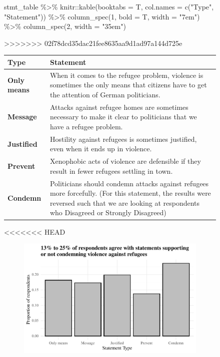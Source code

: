 \documentclass[
]{article}
\newenvironment{Shaded}{\begin{snugshade}}{\end{snugshade}}
\newcommand{\AttributeTok}[1]{\textcolor[rgb]{0.40,0.45,0.13}{#1}}
\newcommand{\DecValTok}[1]{\textcolor[rgb]{0.68,0.00,0.00}{#1}}
\newcommand{\FunctionTok}[1]{\textcolor[rgb]{0.28,0.35,0.67}{#1}}
\newcommand{\NormalTok}[1]{\textcolor[rgb]{0.00,0.23,0.31}{#1}}
\newcommand{\SpecialCharTok}[1]{\textcolor[rgb]{0.37,0.37,0.37}{#1}}
\newcommand{\StringTok}[1]{\textcolor[rgb]{0.13,0.47,0.30}{#1}}
\begin{document}
\begin{figure}
\begin{table}
\begin{Shaded}
\begin{Highlighting}[]
\NormalTok{stmt\_table }\SpecialCharTok{\%\textgreater{}\%} 
\NormalTok{  knitr}\SpecialCharTok{::}\FunctionTok{kable}\NormalTok{(}\AttributeTok{booktabs =}\NormalTok{ T, }\AttributeTok{col.names =} \FunctionTok{c}\NormalTok{(}\StringTok{"Type"}\NormalTok{, }\StringTok{"Statement"}\NormalTok{)) }\SpecialCharTok{\%\textgreater{}\%} 
  \FunctionTok{column\_spec}\NormalTok{(}\DecValTok{1}\NormalTok{, }\AttributeTok{bold =}\NormalTok{ T, }\AttributeTok{width =} \StringTok{"7em"}\NormalTok{) }\SpecialCharTok{\%\textgreater{}\%}
  \FunctionTok{column\_spec}\NormalTok{(}\DecValTok{2}\NormalTok{, }\AttributeTok{width =} \StringTok{"35em"}\NormalTok{)}
\end{Highlighting}
\end{Shaded}

>>>>>>> 02f78dcd35dac21fee8635aa9d1ad97a144d725e
\begin{tabular}{>{\raggedright\arraybackslash}p{7em}>{\raggedright\arraybackslash}p{35em}}
\toprule
Type & Statement\\
\midrule
\textbf{Only means} & When it comes to the refugee problem, violence is sometimes the only means that citizens have to get the attention of German politicians.\\
\textbf{Message} & Attacks against refugee homes are sometimes necessary to make it clear to politicians that we have a refugee problem.\\
\textbf{Justified} & Hostility against refugees is sometimes justified, even when it ends up in violence.\\
\textbf{Prevent} & Xenophobic acts of violence are defensible if they result in fewer refugees settling in town.\\
\textbf{Condemn} & Politicians should condemn attacks against refugees more forcefully. (For this statement, the results were reversed such that we are looking at respondents who Disagreed or Strongly Disagreed)\\
\bottomrule
\end{tabular}
<<<<<<< HEAD
\end{table}

\begin{figure}

{\centering \includegraphics{paper_files/figure-pdf/fig-statements-1.pdf}

}
\end{figure}
\end{figure}
\end{document}
